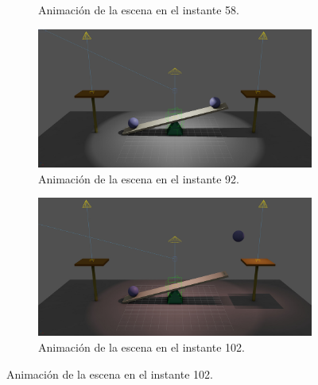 \begin{figure}[H]
\begin{subfigure}[t]{0.48\textwidth}
      \caption{Animación de la escena en el instante 58.}
   \end{subfigure}
   \par\bigskip
   \begin{subfigure}[t]{0.48\textwidth}
      \centering
      \includegraphics[width=\textwidth]{imagenes/animaciones/general/92.jpg}
      \caption{Animación de la escena en el instante 92.}
   \end{subfigure}
   \hfill
   \begin{subfigure}[t]{0.48\textwidth}
      \centering
      \includegraphics[width=\textwidth]{imagenes/animaciones/general/102.jpg}
      \caption{Animación de la escena en el instante 102.}
   \end{subfigure}
\end{figure}

